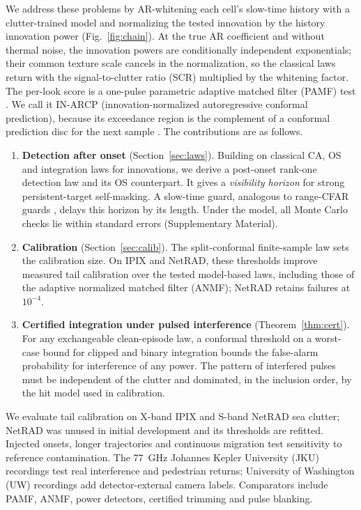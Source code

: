 \documentclass[journal]{IEEEtran}
\begin{document}
We address these problems by AR-whitening each cell's slow-time history with a clutter-trained model and normalizing the tested innovation by the history innovation power (Fig.~\ref{fig:chain}). At the true AR coefficient and without thermal noise, the innovation powers are conditionally independent exponentials; their common texture scale cancels in the normalization, so the classical laws return with the signal-to-clutter ratio (SCR) multiplied by the whitening factor. The per-look score is a one-pulse parametric adaptive matched filter (PAMF) test \cite{roman2000}. We call it IN-ARCP (innovation-normalized autoregressive conformal prediction), because its exceedance region is the complement of a conformal prediction disc for the next sample \cite{lei2018}. The contributions are as follows.
\begin{enumerate}[leftmargin=*,itemsep=2pt]
\item \textbf{Detection after onset} (Section~\ref{sec:laws}). Building on classical CA, OS and integration laws for innovations, we derive a post-onset rank-one detection law and its OS counterpart. It gives a \emph{visibility horizon} for strong persistent-target self-masking. A slow-time guard, analogous to range-CFAR guards \cite{richards2014}, delays this horizon by its length. Under the model, all \NLawChecks{} Monte Carlo checks lie within \LawChecksZBound{} standard errors (Supplementary Material).
\item \textbf{Calibration} (Section~\ref{sec:calib}). The split-conformal finite-sample law \cite{vovk2012} sets the calibration size. On IPIX and NetRAD, these thresholds improve measured tail calibration over the tested model-based laws, including those of the adaptive normalized matched filter (ANMF); NetRAD retains failures at $10^{-4}$.
\item \textbf{Certified integration under pulsed interference} (Theorem~\ref{thm:cert}). For any exchangeable clean-episode law, a conformal threshold on a worst-case bound for clipped \cite{abbasi2018clip} and binary integration bounds the false-alarm probability for interference of any power. The pattern of interfered pulses must be independent of the clutter and dominated, in the inclusion order, by the hit model used in calibration.
\end{enumerate}
We evaluate tail calibration on X-band IPIX and S-band NetRAD sea clutter; NetRAD was unused in initial development and its thresholds are refitted. Injected onsets, longer trajectories and continuous migration test sensitivity to reference contamination. The 77~GHz Johannes Kepler University (JKU) recordings test real interference and pedestrian returns; University of Washington (UW) recordings add detector-external camera labels. Comparators include PAMF, ANMF, power detectors, certified trimming and pulse blanking.
\end{document}
